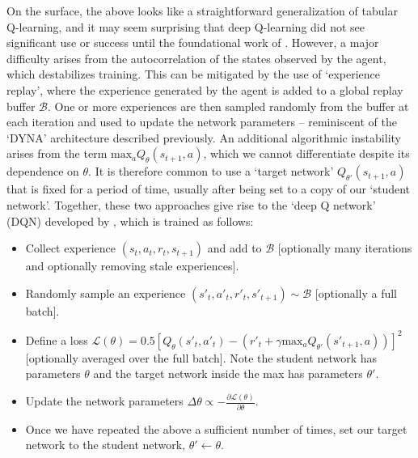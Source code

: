On the surface, the above looks like a straightforward generalization of tabular Q-learning, and it may seem surprising that deep Q-learning did not see significant use or success until the foundational work of \citet{mnih2013playing}.
However, a major difficulty arises from the autocorrelation of the states observed by the agent, which destabilizes training.
This can be mitigated by the use of `experience replay', where the experience generated by the agent is added to a global replay buffer $\mathcal{B}$.
One or more experiences are then sampled randomly from the buffer at each iteration and used to update the network parameters -- reminiscent of the `DYNA' architecture described previously.
An additional algorithmic instability arises from the term $\text{max}_a Q_\theta(s_{t+1}, a)$, which we cannot differentiate despite its dependence on $\theta$.
It is therefore common to use a `target network' $Q_{\theta'}(s_{t+1}, a)$ that is fixed for a period of time, usually after being set to a copy of our `student network'.
Together, these two approaches give rise to the `deep Q network' (DQN) developed by \citet{mnih2013playing}, which is trained as follows:
\begin{itemize}
    \item Collect experience $(s_t, a_t, r_t, s_{t+1})$ and add to $\mathcal{B}$ [optionally many iterations and optionally removing stale experiences].
    \item Randomly sample an experience $(s'_t, a'_t, r'_t, s'_{t+1}) \sim \mathcal{B}$ [optionally a full batch].
    \item Define a loss $\mathcal{L}(\theta) = 0.5 [ Q_\theta(s'_t, a'_t) - (r'_t + \gamma \text{max}_a Q_{\theta'}(s'_{t+1}, a)) ]^2 $ [optionally averaged over the full batch]. Note the student network has parameters $\theta$ and the target network inside the max has parameters $\theta'$.
    \item Update the network parameters $\Delta \theta \propto - \frac{\partial \mathcal{L}(\theta)}{\partial \theta}$.
    \item Once we have repeated the above a sufficient number of times, set our target network to the student network, $\theta' \leftarrow \theta$.
\end{itemize}
